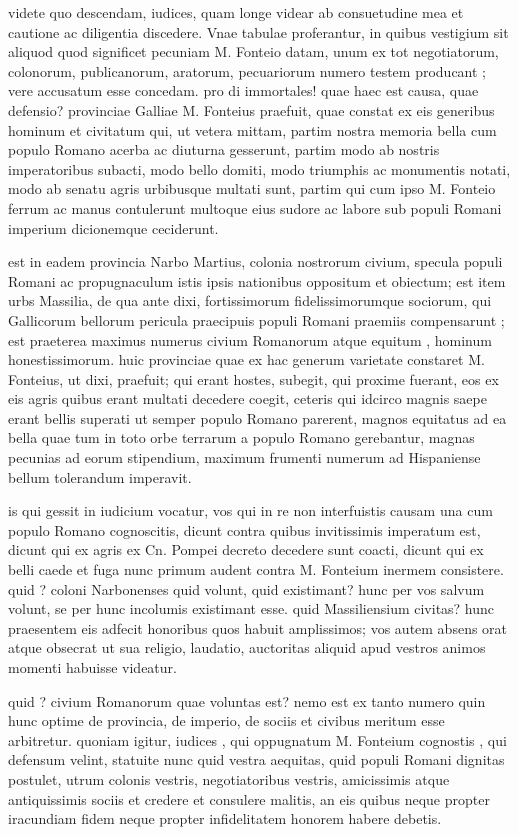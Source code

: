  videte quo descendam, iudices, quam longe videar ab consuetudine mea et cautione ac diligentia discedere. Vnae tabulae proferantur, in quibus vestigium sit aliquod quod significet pecuniam M. Fonteio datam, unum ex tot negotiatorum, colonorum, publicanorum, aratorum, pecuariorum numero testem producant ; vere accusatum esse concedam. pro di immortales! quae haec est causa, quae defensio? provinciae Galliae M. Fonteius praefuit, quae constat ex eis generibus hominum et civitatum qui, ut vetera mittam, partim nostra memoria bella cum populo Romano acerba ac diuturna gesserunt, partim modo ab nostris imperatoribus subacti, modo bello domiti, modo triumphis ac monumentis notati, modo ab senatu agris urbibusque multati sunt, partim qui cum ipso M. Fonteio ferrum ac manus contulerunt multoque eius sudore ac labore sub populi Romani imperium dicionemque ceciderunt.

 est in eadem provincia Narbo Martius, colonia nostrorum civium, specula populi Romani ac propugnaculum istis ipsis nationibus oppositum et obiectum; est item urbs Massilia, de qua ante dixi, fortissimorum fidelissimorumque sociorum, qui Gallicorum bellorum pericula praecipuis populi Romani praemiis compensarunt ; est praeterea maximus numerus civium Romanorum atque equitum , hominum honestissimorum. huic provinciae quae ex hac generum varietate constaret M. Fonteius, ut dixi, praefuit; qui erant hostes, subegit, qui proxime fuerant, eos ex eis agris quibus erant multati decedere coegit, ceteris qui idcirco magnis saepe erant bellis superati ut semper populo Romano parerent, magnos equitatus ad ea bella quae tum in toto orbe terrarum a populo Romano gerebantur, magnas pecunias ad eorum stipendium, maximum frumenti numerum ad Hispaniense bellum tolerandum imperavit.

 is qui gessit in iudicium vocatur, vos qui in re non interfuistis causam una cum populo Romano cognoscitis, dicunt contra quibus invitissimis imperatum est, dicunt qui ex agris ex Cn. Pompei decreto decedere sunt coacti, dicunt qui ex belli caede et fuga nunc primum audent contra M. Fonteium inermem consistere. quid ? coloni Narbonenses quid volunt, quid existimant? hunc per vos salvum volunt, se per hunc incolumis existimant esse. quid Massiliensium civitas? hunc praesentem eis adfecit honoribus quos habuit amplissimos; vos autem absens orat atque obsecrat ut sua religio, laudatio, auctoritas aliquid apud vestros animos momenti habuisse videatur.

 quid ? civium Romanorum quae voluntas est? nemo est ex tanto numero quin hunc optime de provincia, de imperio, de sociis et civibus meritum esse arbitretur. quoniam igitur, iudices , qui oppugnatum M. Fonteium cognostis , qui defensum velint, statuite nunc quid vestra aequitas, quid populi Romani dignitas postulet, utrum colonis vestris, negotiatoribus vestris, amicissimis atque antiquissimis sociis et credere et consulere malitis, an eis quibus neque propter iracundiam fidem neque propter infidelitatem honorem habere debetis.

